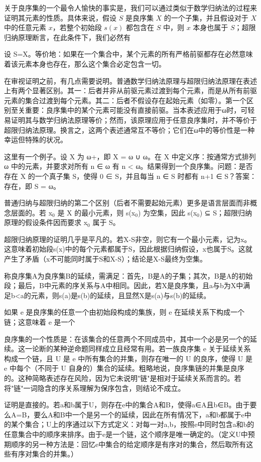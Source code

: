 \documentclass[12pt,a4paper]{ctexbook}
\theoremstyle{definition}
\theoremstyle{remark}
\begin{document}
{关于良序集的一个最令人愉快的事实是，我们可以通过类似于数学归纳法的过程来证明其元素的性质。具体来说，假设 \( S \) 是良序集 \( X \) 的一个子集，并且假设对于 \( X \) 中的任意元素 \( x \)，若整个初始段 \( s(x) \) 都包含在 \( S \) 中，则 \( x \) 本身也属于 \( S \)；超限归纳原理断言，在此条件下，我们必然有

设 S=X。等价地：如果在一个集合中，某个元素的所有严格前驱都存在必然意味着该元素本身也存在，那么这个集合必定包含一切。

在审视证明之前，有几点需要说明。普通数学归纳法原理与超限归纳法原理在表述上有两个显著区别。其一：后者并非从前驱元素过渡到每个元素，而是从所有前驱元素的集合过渡到每个元素。其二：后者不假设存在起始元素（如零）。第一个区别至关重要：良序集中的某个元素可能没有直接前驱。当本表述应用于ω时，可轻易证明其与数学归纳法原理等价；然而，该原理应用于任意良序集时，并不等价于超限归纳法原理。换言之，这两个表述通常互不等价；它们在ω中的等价性是一种幸运但特殊的状况。

这里有一个例子。设 X 为 ω+，即 X = ω ∪ {ω}。在 X 中定义序：按通常方式排列 ω 中的元素，并要求对所有 n ∈ ω 有 n < ω。结果得到一个良序集。问题：是否存在 X 的一个真子集 S，使得 0 ∈ S，并且每当 n ∈ S 时都有 n+1 ∈ S？答案：存在，即 S = ω。

普通归纳与超限归纳的第二个区别（后者不需要起始元素）更多是语言层面而非概念层面的。若 x$_{0}$ 是 X 的最小元素，则 s(x$_{0}$) 为空集，因此 s(x$_{0}$) ⊆ S；超限归纳原理的假设条件因而要求 x$_{0}$ 属于 S。

超限归纳原理的证明几乎是平凡的。若X-S非空，则它有一个最小元素，记为x。这意味着初始段s(x)中的每个元素都属于S，因此根据归纳假设，x也属于S。这就产生了矛盾（x不可能同时属于S和X-S）；结论是X-S最终为空集。

称良序集A为良序集B的延续，需满足：首先，B是A的子集；其次，B是A的初始段；最后，B中元素的序关系与A中相同。因此，若X是良序集，且a与b为X中满足b<a的元素，则s(a)是s(b)的延续，且显然X是s(a)与s(b)的延续。

如果 e 是良序集的任意一个由初始段构成的集族，则 e 在延续关系下构成一个链；这意味着 e 是一个

良序集的一个性质是：在该集合的任意两个不同成员中，其中一个必是另一个的延续。这一论断的某种逆命题同样成立且经常有用。若一族良序集 e 关于延续关系构成一个链，且 U 是 e 中所有集合的并集，则存在唯一的 U 的良序，使得 U 是 e 中每个（不同于 U 自身的）集合的延续。粗略地说，良序集链的并集是良序的。这种简略表述存在风险，因为它未说明"链"是相对于延续关系而言的。若将"链"一词隐含的序关系理解为保序包含，则结论不成立。

证明是直接的。若a和b属于U，则存在e中的集合A和B，使得a∈A且b∈B。由于要么A=B，要么A和B中一个是另一个的延续，因此在所有情况下，a和b都属于e中的某个集合；U上的序通过以下方式定义：对每一对{a,b}，按照e中同时包含a和b的任意集合中的顺序来排序。由于e是一个链，这个顺序是唯一确定的。（定义U中预期顺序的另一种方法是：回忆e中集合的给定顺序是有序对的集合，然后取所有这些有序对集合的并集。）

}
\end{document}

